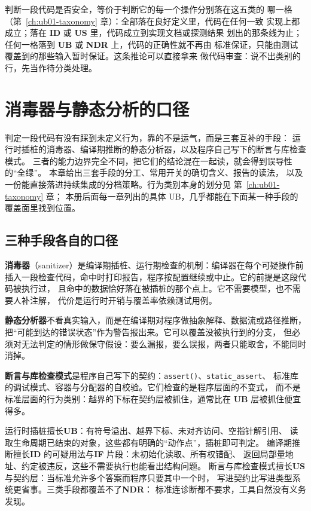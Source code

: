 \documentclass[12pt,a4paper,fontset=fandol]{ctexbook}
\newcommand{\Fn}[1]{\texttt{#1()}}
\newcommand{\Tp}[1]{\texttt{#1}}
\newcommand{\UB}{\textbf{\textsf{UB}}}
\newcommand{\IDB}{\textbf{\textsf{ID}}}
\newcommand{\USB}{\textbf{\textsf{US}}}
\newcommand{\NDR}{\textbf{\textsf{NDR}}}
\newcommand{\ILLF}{\textbf{\textsf{IF}}}
\begin{document}
\begin{note}[title={一条可检验的推论}]
判断一段代码是否安全，等价于判断它的每一个操作分别落在这五类的
哪一格（第~\ref{ch:ub01-taxonomy} 章）：全部落在良好定义里，代码在任何一致
实现上都成立；落在 \IDB{} 或 \USB{} 里，代码成立到实现文档或探测结果
划出的那条线为止；任何一格落到 \UB{} 或 \NDR{} 上，代码的正确性就不再由
标准保证，只能由测试覆盖到的那些输入暂时保证。这条推论可以直接拿来
做代码审查：说不出类别的行，先当作待分类处理。
\end{note}

\chapter{消毒器与静态分析的口径}\label{ch:ub03-sanitizers}

判定一段代码有没有踩到未定义行为，靠的不是运气，而是三套互补的手段：
运行时插桩的消毒器、编译期推断的静态分析器，以及程序自己写下的断言与库检查模式。
三者的能力边界完全不同，把它们的结论混在一起读，就会得到误导性的“全绿”。
本章给出三套手段的分工、常用开关的确切含义、报告的读法，
以及一份能直接落进持续集成的分档策略。行为类别本身的划分见 第~\ref{ch:ub01-taxonomy} 章；
本册后面每一章列出的具体 UB，几乎都能在下面某一种手段的覆盖面里找到位置。

\section{三种手段各自的口径}\label{sec:ub03-division}

\textbf{消毒器}（sanitizer）是编译期插桩、运行期检查的机制：编译器在每个可疑操作前
插入一段检查代码，命中时打印报告，程序按配置继续或中止。它的前提是这段代码被执行过，
且命中的数据恰好落在被插桩的那个点上。它不需要模型，也不需要人补注解，
代价是运行时开销与覆盖率依赖测试用例。

\textbf{静态分析器}不看真实输入，而是在编译期对程序做抽象解释、数据流或路径推断，
把“可能到达的错误状态”作为警告报出来。它可以覆盖没被执行到的分支，
但必须对无法判定的情形做保守假设：要么漏报，要么误报，两者只能取舍，不能同时消掉。

\textbf{断言与库检查模式}是程序自己写下的契约：\Fn{assert}、\Tp{static\_assert}、
标准库的调试模式、容器与分配器的自校验。它们检查的是程序层面的不变式，
而不是标准层面的行为类别：越界的下标在契约层被抓住，通常比在 \UB{} 层被抓住便宜得多。

\begin{compare}[title={三类手段能覆盖哪一类行为}]
运行时插桩擅长\UB{}：有符号溢出、越界下标、未对齐访问、空指针解引用、
读取生命周期已结束的对象，这些都有明确的“动作点”，插桩即可判定。
编译期推断擅长\IDB{} 的可疑用法与\ILLF{} 片段：未初始化读取、所有权错配、
返回局部量地址、约定被违反，这些不需要执行也能看出结构问题。
断言与库检查模式擅长\USB{} 与契约层：当标准允许多个答案而程序只要其中一个时，
写进契约比写进类型系统更省事。三类手段都覆盖不了\NDR{}：
标准连诊断都不要求，工具自然没有义务发现。
\end{compare}
\end{document}
